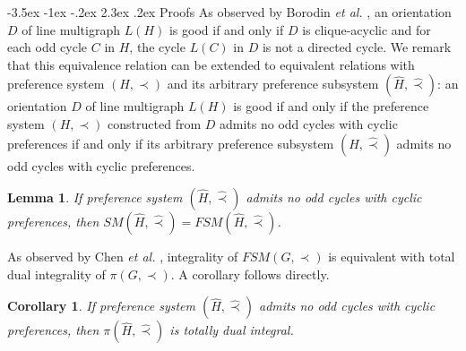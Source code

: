 \documentclass[11pt]{article}
\makeatletter
\newtheorem{lemma}[theorem]{Lemma}
\newtheorem{corollary}[theorem]{Corollary}
\numberwithin{theorem}{section}
\renewcommand\section{%
  \@startsection{section}{1}
                {\z@}%
                {-3.5ex \@plus -1ex \@minus -.2ex}%
                {2.3ex \@plus.2ex}%
                {\large\bfseries}%
}
\makeatother
\begin{document}
\section{Proofs}
As observed by Borodin \textit{et al.} \cite{BoroKost98}, an orientation $D$ of line multigraph $L(H)$ is good if and only if $D$ is clique-acyclic and for each odd cycle $C$ in $H$, the cycle $L(C)$ in $D$ is not a directed cycle. We remark that this equivalence relation can be extended to equivalent relations with preference system $(H,\prec)$ and its arbitrary preference subsystem $(\hat{H},\hat\prec)$: an orientation $D$ of line multigraph $L(H)$ is good if and only if the preference system $(H,\prec)$ constructed from $D$ admits no odd cycles with cyclic preferences if and only if its arbitrary preference subsystem $(\hat{H},\hat\prec)$ admits no odd cycles with cyclic preferences.

\begin{lemma}
\label{lem:prf1}
If preference system $(\hat{H},\hat\prec)$ admits no odd cycles with cyclic preferences, then $SM(\hat{H},\hat\prec)=FSM(\hat{H},\hat\prec)$.
\end{lemma}

As observed by Chen \textit{et al.} \cite{ChenDing12}, integrality of $FSM(G,\prec)$ is equivalent with total dual integrality of $\pi(G,\prec)$. A corollary follows directly.

\begin{corollary}
\label{cor:prf2}
If preference system $(\hat{H},\hat\prec)$ admits no odd cycles with cyclic preferences, then $\pi(\hat{H},\hat\prec)$ is totally dual integral.
\end{corollary}
\end{document}
